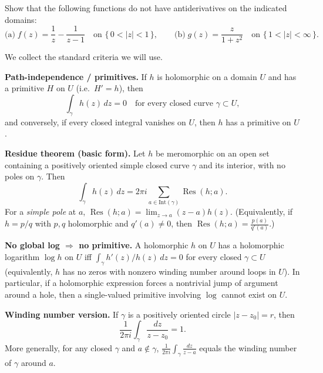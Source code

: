 \begin{problem}[CP-IV-0036]
\label{prob:cp-iv-0036}
Show that the following functions do not have antiderivatives on the indicated domains:
\[
\text{(a)}\; f(z)=\frac{1}{z}-\frac{1}{z-1}\quad\text{on } \{\,0<|z|<1\,\},\qquad
\text{(b)}\; g(z)=\frac{z}{1+z^{2}}\quad\text{on } \{\,1<|z|<\infty\,\}.
\]

We collect the standard criteria we will use.

	\par\noindent\textbullet\quad \textbf{Path-independence / primitives.} If $h$ is holomorphic on a domain $U$ and has a primitive $H$ on $U$ (i.e.\ $H'=h$), then
	\[
	\int_\gamma h(z)\,dz=0 \quad \text{for every closed curve }\gamma\subset U,
	\]
	and conversely, if every closed integral vanishes on $U$, then $h$ has a primitive on $U$.

	\par\noindent\textbullet\quad \textbf{Residue theorem (basic form).} Let $h$ be meromorphic on an open set containing a positively oriented simple closed curve $\gamma$ and its interior, with no poles on $\gamma$. Then
	\[
	\int_\gamma h(z)\,dz = 2\pi i \sum_{a\in \mathrm{Int}(\gamma)} \operatorname{Res}(h;a).
	\]
	For a \emph{simple pole} at $a$, $\displaystyle \operatorname{Res}(h;a)=\lim_{z\to a}(z-a)h(z)$.
	(Equivalently, if $h=p/q$ with $p,q$ holomorphic and $q'(a)\neq 0$, then
	$\displaystyle \operatorname{Res}(h;a)=\frac{p(a)}{q'(a)}$.)

	\par\noindent\textbullet\quad \textbf{No global log $\Rightarrow$ no primitive.} A holomorphic $h$ on $U$ has a holomorphic logarithm $\log h$ on $U$ iff $\int_\gamma h'(z)/h(z)\,dz=0$ for every closed $\gamma\subset U$ (equivalently, $h$ has no zeros with nonzero winding number around loops in $U$). In particular, if a holomorphic expression forces a nontrivial jump of argument around a hole, then a single-valued primitive involving $\log$ cannot exist on $U$.

	\par\noindent\textbullet\quad \textbf{Winding number version.} If $\gamma$ is a positively oriented circle $|z-z_0|=r$, then
	\[
	\frac{1}{2\pi i}\int_\gamma \frac{dz}{z-z_0}=1.
	\]
	More generally, for any closed $\gamma$ and $a\notin \gamma$, $\displaystyle \frac{1}{2\pi i}\int_\gamma \frac{dz}{z-a}$
	equals the winding number of $\gamma$ around $a$.
\end{problem}



